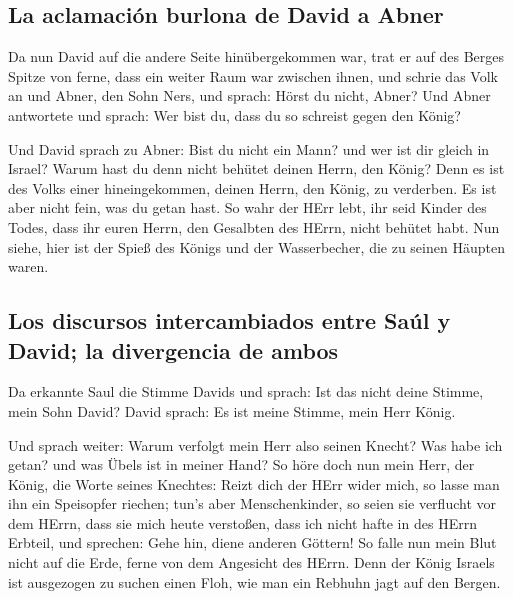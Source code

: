 \hypertarget{la-aclamaciuxf3n-burlona-de-david-a-abner}{%
\subsection{La aclamación burlona de David a
Abner}\label{la-aclamaciuxf3n-burlona-de-david-a-abner}}

 Da nun David auf die andere Seite hinübergekommen war,
trat er auf des Berges Spitze von ferne, dass ein weiter Raum war
zwischen ihnen,  und schrie das Volk an und Abner, den
Sohn Ners, und sprach: Hörst du nicht, Abner? Und Abner antwortete und
sprach: Wer bist du, dass du so schreist gegen den König?

 Und David sprach zu Abner: Bist du nicht ein Mann? und
wer ist dir gleich in Israel? Warum hast du denn nicht behütet deinen
Herrn, den König? Denn es ist des Volks einer hineingekommen, deinen
Herrn, den König, zu verderben.  Es ist aber nicht fein,
was du getan hast. So wahr der HErr lebt, ihr seid Kinder des Todes,
dass ihr euren Herrn, den Gesalbten des HErrn, nicht behütet habt. Nun
siehe, hier ist der Spieß des Königs und der Wasserbecher, die zu seinen
Häupten waren.

\hypertarget{los-discursos-intercambiados-entre-sauxfal-y-david-la-divergencia-de-ambos}{%
\subsection{Los discursos intercambiados entre Saúl y David; la
divergencia de
ambos}\label{los-discursos-intercambiados-entre-sauxfal-y-david-la-divergencia-de-ambos}}

 Da erkannte Saul die Stimme Davids und sprach: Ist das
nicht deine Stimme, mein Sohn David? David sprach: Es ist meine Stimme,
mein Herr König.

 Und sprach weiter: Warum verfolgt mein Herr also seinen
Knecht? Was habe ich getan? und was Übels ist in meiner Hand?
 So höre doch nun mein Herr, der König, die Worte seines
Knechtes: Reizt dich der HErr wider mich, so lasse man ihn ein
Speisopfer riechen; tun's aber Menschenkinder, so seien sie verflucht
vor dem HErrn, dass sie mich heute verstoßen, dass ich nicht hafte in
des HErrn Erbteil, und sprechen: Gehe hin, diene anderen Göttern!
 So falle nun mein Blut nicht auf die Erde, ferne von dem
Angesicht des HErrn. Denn der König Israels ist ausgezogen zu suchen
einen Floh, wie man ein Rebhuhn jagt auf den Bergen.


